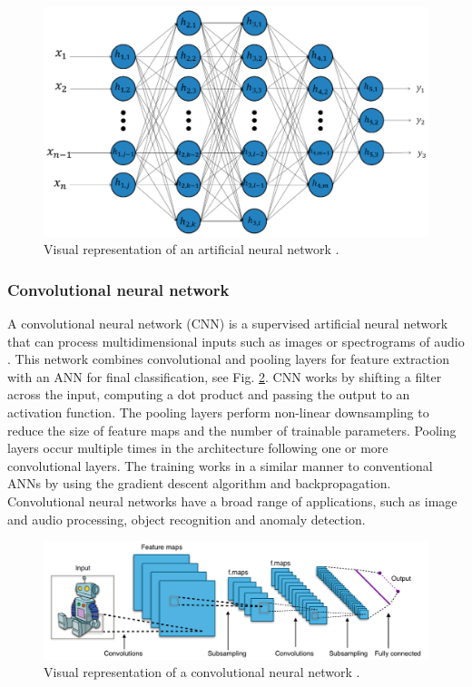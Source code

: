 \documentclass[conference, 11pt]{IEEEtran}
\begin{document}
    \begin{figure}[htbp]
        \centerline{\includegraphics[width=\linewidth]{figures/ann.jpg}}
        \caption{Visual representation of an artificial neural network \cite{article:18}.}
        \label{fig:ann}
    \end{figure}

    \subsubsection{Convolutional neural network}
    A convolutional neural network (CNN) is a supervised artificial neural network that can process multidimensional inputs such as images or spectrograms of audio \cite{lecun1995convolutional}.
    This network combines convolutional and pooling layers for feature extraction with an ANN for final classification, see Fig. \ref{fig:cnn}.
    CNN works by shifting a filter across the input, computing a dot product and passing the output to an activation function.
    The pooling layers perform non-linear downsampling to reduce the size of feature maps and the number of trainable parameters.
    Pooling layers occur multiple times in the architecture following one or more convolutional layers.
    The training works in a similar manner to conventional ANNs by using the gradient descent algorithm and backpropagation.
    Convolutional neural networks have a broad range of applications, such as image and audio processing, object recognition and anomaly detection.

    \begin{figure}[htbp]
        \centerline{\includegraphics[width=\linewidth]{figures/cnn2.png}}
        \caption{Visual representation of a convolutional neural network \cite{ConvNet}.}
        \label{fig:cnn}
    \end{figure}
\end{document}
